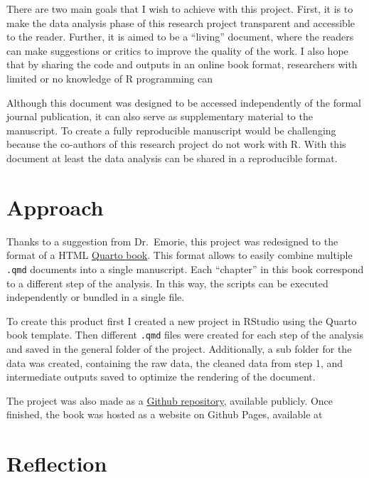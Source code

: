 \documentclass[
  letterpaper,
  DIV=11,
  numbers=noendperiod]{scrreprt}
\begin{document}

There are two main goals that I wish to achieve with this project.
First, it is to make the data analysis phase of this research project
transparent and accessible to the reader. Further, it is aimed to be a
``living'' document, where the readers can make suggestions or critics
to improve the quality of the work. I also hope that by sharing the code
and outputs in an online book format, researchers with limited or no
knowledge of R programming can

Although this document was designed to be accessed independently of the
formal journal publication, it can also serve as supplementary material
to the manuscript. To create a fully reproducible manuscript would be
challenging because the co-authors of this research project do not work
with R. With this document at least the data analysis can be shared in a
reproducible format.

\hypertarget{approach}{%
\section*{Approach}\label{approach}}


Thanks to a suggestion from Dr.~Emorie, this project was redesigned to
the format of a HTML \href{https://quarto.org/docs/books/}{Quarto book}.
This format allows to easily combine multiple \texttt{.qmd} documents
into a single manuscript. Each ``chapter'' in this book correspond to a
different step of the analysis. In this way, the scripts can be executed
independently or bundled in a single file.

To create this product first I created a new project in RStudio using
the Quarto book template. Then different \texttt{.qmd} files were
created for each step of the analysis and saved in the general folder of
the project. Additionally, a sub folder for the data was created,
containing the raw data, the cleaned data from step 1, and intermediate
outputs saved to optimize the rendering of the document.

The project was also made as a
\href{https://github.com/marwincarmo/sas}{Github repository}, available
publicly. Once finished, the book was hosted as a website on Github
Pages, available at

\hypertarget{reflection}{%
\section*{Reflection}\label{reflection}}
\end{document}
